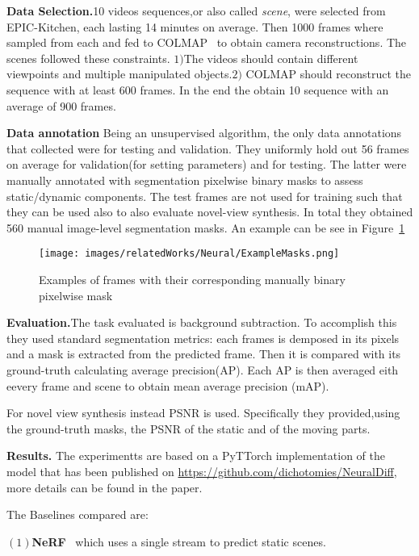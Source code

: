 \textbf{Data Selection.}10 videos sequences,or also called \textit{scene}, were selected from EPIC-Kitchen, each lasting 14 minutes
on average. Then 1000 frames where sampled from each and fed to COLMAP~\cite{colmap} to obtain
camera reconstructions. The scenes followed these constraints. $1)$The videos
should contain different viewpoints and multiple manipulated objects.$2)$ COLMAP should reconstruct
the sequence with at least 600 frames. In the end the obtain 10 sequence with an average of 900 frames.

\textbf{Data annotation}
Being an unsupervised algorithm, the only data annotations that collected were for testing and 
validation. They uniformly hold out 56 frames on average for validation(for setting parameters)
and for testing. The latter were manually annotated with segmentation pixelwise binary masks to assess static/dynamic components.
The test frames are not used for training such that they can be used also to also evaluate 
novel-view synthesis. In total they obtained 560 manual image-level segmentation masks. An example can
be see in Figure~\ref{fig:exMasks}
\begin{figure}
    \centering
    \texttt{[image: images/relatedWorks/Neural/ExampleMasks.png]} 
    \caption{Examples of frames with their corresponding manually binary pixelwise mask}\label{fig:exMasks}
\end{figure}

\textbf{Evaluation.}The task evaluated is background subtraction. To accomplish this they
used standard segmentation metrics: each frames is demposed in its pixels and a mask is 
extracted from the predicted frame. Then it is compared with its ground-truth calculating 
average precision(AP). Each AP is then averaged eith eevery frame and scene to obtain mean 
average precision (mAP).

For novel view synthesis instead PSNR is used. Specifically they provided,using the 
ground-truth masks, the PSNR of the static and of the moving parts.\vspace{0.4cm}

\textbf{Results.} The experimentts are based on a PyTTorch implementation of the model
that has been published on \url{https://github.com/dichotomies/NeuralDiff}, more details 
can be found in the paper. 

The Baselines compared are:

$(1)$\textbf{NeRF}~\cite{nerf} which uses a single stream to predict static scenes.

